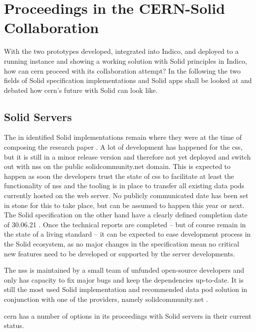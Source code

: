 \section{Proceedings in the CERN-Solid Collaboration}

With the two prototypes developed, integrated into Indico, and deployed to a running instance and showing a working solution with Solid principles in Indico, how can \gls{cern} proceed with its collaboration attempt? In the following the two fields of Solid specification implementations and Solid apps shall be looked at and debated how \gls{cern}'s future with Solid can look like.

\subsection{Solid Servers}

The in \cite{cern-solid-investigation-spec} identified Solid implementations remain where they were at the time of composing the research paper \cite{cern-solid-investigation-spec}. A lot of development has happened for the \gls{css}, but it is still in a minor release version and therefore not yet deployed and switch out with \gls{nss} on the public solidcommunity.net domain. This is expected to happen as soon the developers trust the state of \gls{css} to facilitate at least the functionality of \gls{nss} and the tooling is in place to transfer all existing data pods currently hosted on the web server. No publicly communicated date has been set in stone for this to take place, but can be assumed to happen this year or next. The Solid specification on the other hand have a clearly defined completion date of 30.06.21 \cite{solid-tr}. Once the technical reports are completed -- but of course remain in the state of a living standard -- it can be expected to ease development process in the Solid ecosystem, as no major changes in the specification mean no critical new features need to be developed or supported by the server developments.

The \gls{nss} is maintained by a small team of unfunded open-source developers and only has capacity to fix major bugs and keep the dependencies up-to-date. It is still the most used Solid implementation and recommended data pod solution in conjunction with one of the providers, namely solidcommunity.net \cite{solid-community}.

\gls{cern} has a number of options in its proceedings with Solid servers in their current status.

